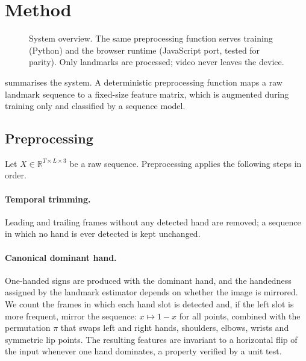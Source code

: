 \section{Method}
\label{sec:method}

\begin{figure}[t]
  \centering
  
  \caption{System overview. The same preprocessing function serves training (Python) and the
  browser runtime (JavaScript port, tested for parity). Only landmarks are processed; video never
  leaves the device.}
  \label{fig:pipeline}
\end{figure}

 summarises the system. A deterministic preprocessing function maps a raw
landmark sequence to a fixed-size feature matrix, which is augmented during training only and
classified by a sequence model.

\subsection{Preprocessing}
\label{sec:preprocessing}

Let $X\in\mathbb{R}^{T\times L\times3}$ be a raw sequence. Preprocessing applies the following
steps in order.

\paragraph{Temporal trimming.} Leading and trailing frames without any detected hand are removed;
a sequence in which no hand is ever detected is kept unchanged.

\paragraph{Canonical dominant hand.} One-handed signs are produced with the dominant hand, and the
handedness assigned by the landmark estimator depends on whether the image is mirrored. We count
the frames in which each hand slot is detected and, if the left slot is more frequent, mirror the
sequence: $x\mapsto 1-x$ for all points, combined with the permutation $\pi$ that swaps left and
right hands, shoulders, elbows, wrists and symmetric lip points. The resulting features are
invariant to a horizontal flip of the input whenever one hand dominates, a property verified by a
unit test.

